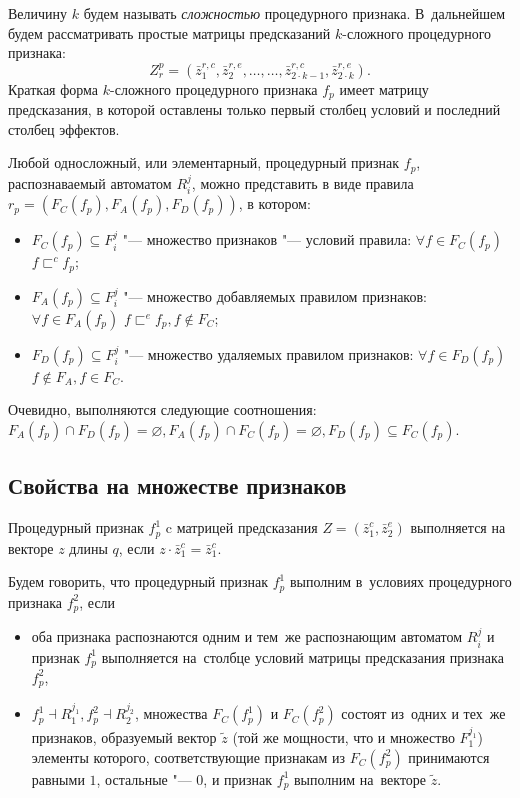 Величину $k$ будем называть \textit{сложностью} процедурного признака. В~дальнейшем будем рассматривать простые матрицы предсказаний $k$-сложного процедурного признака:
\begin{equation}
	Z_r^p=(\bar z_1^{r,c},\bar z_2^{r,e},\dots,\dots,\bar z_{2\cdot k-1}^{r,c},\bar z_{2\cdot k}^{r,e}).
\end{equation}
Краткая форма $k$-сложного процедурного признака $f_p$ имеет матрицу предсказания, в которой оставлены только первый столбец условий и последний столбец эффектов.

Любой односложный, или элементарный, процедурный признак $f_p$, распознаваемый автоматом $R_i^j$, можно представить в виде правила $r_p=(F_C(f_p),F_A(f_p),F_D(f_p))$, в котором:
\begin{itemize}
	\item $F_C (f_p )\subseteq F_i^j$ "--- множество признаков "--- условий правила: $\forall f\in F_C(f_p)$ $f\sqsubset^c f_p$;
	\item $F_A(f_p)\subseteq F_i^j$ "--- множество добавляемых правилом признаков: $\forall f\in F_A(f_p)$ $f\sqsubset^e f_p,f\notin F_C$;
	\item $F_D(f_p)\subseteq F_i^j$ "--- множество удаляемых правилом признаков: $\forall f\in F_D(f_p)$ $f\notin F_A,f\in F_C$.
\end{itemize}

Очевидно, выполняются следующие соотношения: $F_A(f_p)\cap F_D(f_p)=\varnothing, F_A(f_p)\cap F_C(f_p)=\varnothing, F_D(f_p)\subseteq F_C(f_p)$.

\subsection{Свойства на множестве признаков}

\begin{Def}
	Процедурный признак $f_p^1$ c матрицей предсказания $Z=(\bar z_1^c,\bar z_2^e)$ выполняется на векторе $z$ длины $q$, если $z\cdot \bar z_1^c=\bar z_1^c$.
\end{Def}
Будем говорить, что процедурный признак $f_p^1$ выполним в~условиях процедурного признака $f_p^2$, если 
\begin{itemize}
	\item оба признака распознаются одним и тем~же распознающим автоматом $R_i^j$ и признак  $f_p^1$ выполняется на~столбце условий матрицы предсказания признака $f_p^2$,
	\item $f_p^1\dashv R_1^{j_1}, f_p^2\dashv R_2^{j_2}$, множества $F_C(f_p^1 )$ и $F_C(f_p^2)$ состоят из~одних и тех~же признаков, образуемый вектор $\tilde z$ (той же мощности, что и множество $F_1^{j_1}$) элементы которого, соответствующие признакам из $F_C(f_p^2)$ принимаются равными $1$,  остальные "--- $0$, и признак $f_p^1$ выполним на~векторе $\tilde z$. 
\end{itemize}

